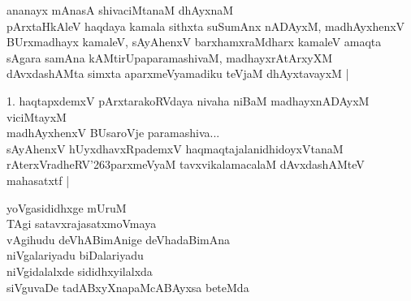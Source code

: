 \begin{entry}
\gl{}
\info{}{}{}{}
\begin{shl}
ananayx mAnasA shivaciMtanaM dhAyxnaM\\
pArxtaHkAleV haqdaya kamala sithxta suSumAnx nADAyxM, madhAyxhenxV\\
BUrxmadhayx kamaleV, sAyAhenxV barxhamxraMdharx kamaleV amaqta\\
sAgara samAna kAMtirUpaparamashivaM, madhayxrAtArxyXM\\
dAvxdashAMta simxta aparxmeVyamadiku teVjaM dhAyxtavayxM |
\end{shl}
\begin{shl}
1. haqtapxdemxV pArxtarakoRVdaya nivaha niBaM madhayxnADAyxM viciMtayxM\\
madhAyxhenxV BUsaroVje paramashiva...\\
sAyAhenxV hUyxdhavxRpademxV haqmaqtajalanidhidoyxVtanaM\\
rAterxVradheRV\char'263parxmeVyaM tavxvikalamacalaM dAvxdashAMteV mahasatxtf |
\end{shl}
\end{entry}

\begin{entry}
\gl{}
\begin{shl}
\end{shl}
\end{entry}

\begin{entry}
\end{entry}

\begin{entry}
\begin{shl}
yoVgasididhxge mUruM\\
TAgi satavxrajasatxmoVmaya\\
vAgihudu deVhABimAnige deVhadaBimAna\\
niVgalariyadu biDalariyadu\\
niVgidalalxde sididhxyilalxda\\
siVguvaDe tadABxyXnapaMcABAyxsa beteMda
\end{shl}
\end{entry}

